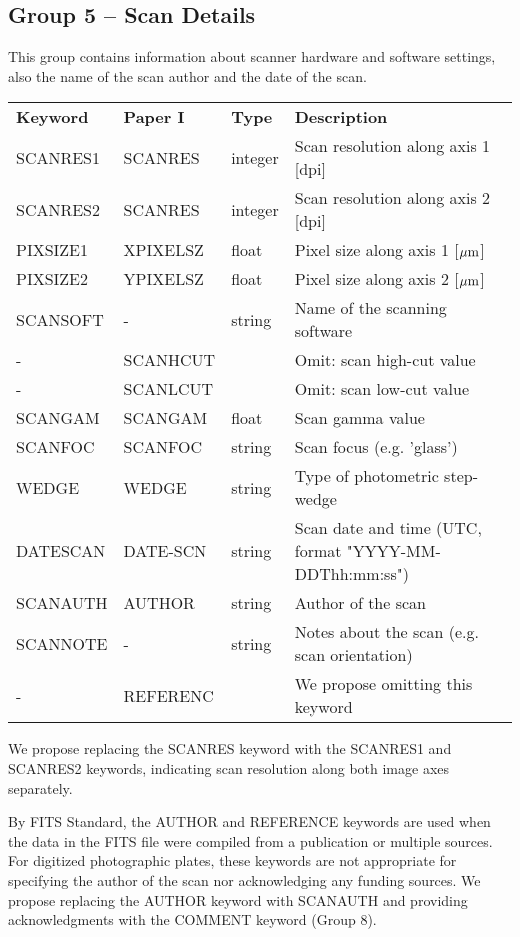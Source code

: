 \documentclass[11pt]{ivoa}
\begin{document}
\subsection{Group 5 – Scan Details}

This group contains information about scanner hardware and software
settings, also the name of the scan author and the date of the scan.

\begin{inlinetable}
\footnotesize
\begin{tabular}{lllp{}}
\sptablerule
\textbf{Keyword}&\textbf{Paper I}&\textbf{Type}&\textbf{Description}\\
\sptablerule
SCANRES1 &SCANRES    &integer &Scan resolution along axis 1 [dpi]\\
SCANRES2 &SCANRES    &integer &Scan resolution along axis 2 [dpi]\\
PIXSIZE1 &XPIXELSZ   &float   &Pixel size along axis 1 [$\mu\rm m$]\\
PIXSIZE2 &YPIXELSZ   &float   &Pixel size along axis 2 [$\mu\rm m$]\\
SCANSOFT &-          &string  &Name of the scanning software\\
-        &SCANHCUT   &        &Omit: scan high-cut value\\
-        &SCANLCUT   &        &Omit: scan low-cut value\\
SCANGAM  &SCANGAM    &float   &Scan gamma value\\
SCANFOC  &SCANFOC    &string  &Scan focus (e.g. 'glass')\\
WEDGE    &WEDGE      &string  &Type of photometric step-wedge\\
DATESCAN &DATE-SCN   &string  &
  Scan date and time (UTC, format "YYYY-MM-DDThh:mm:ss")\\
SCANAUTH &AUTHOR     &string  &Author of the scan\\
SCANNOTE &-          &string  &
  Notes about the scan (e.g. scan orientation)\\
-        &REFERENC   &        &We propose omitting this keyword \
\end{tabular}
\end{inlinetable}


We propose replacing the SCANRES keyword with the SCANRES1 and SCANRES2
keywords, indicating scan resolution along both image axes separately.

By FITS Standard, the AUTHOR and REFERENCE keywords are used when the
data in the FITS file were compiled from a publication or multiple
sources. For digitized photographic plates, these keywords are not
appropriate for specifying the author of the scan nor acknowledging any
funding sources. We propose replacing the AUTHOR keyword with SCANAUTH
and providing acknowledgments with the COMMENT keyword (Group 8).
\end{document}
